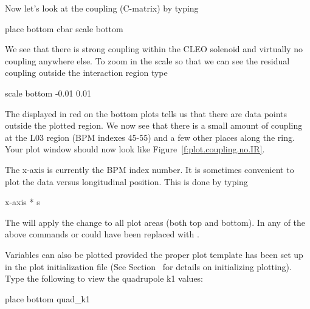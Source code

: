 Now let's look at the coupling (C-matrix) by typing
\begin{example}
  place bottom cbar
  scale bottom
\end{example}
We see that there is strong coupling within the CLEO solenoid and
virtually no coupling anywhere else. To zoom in the scale so that we
can see the residual coupling outside the interaction region type
\begin{example}
  scale bottom -0.01 0.01
\end{example}
The  displayed in red on the bottom plots tells us
that there are data points outside the plotted region.  We now see
that there is a small amount of coupling at the L03 region (BPM
indexes 45-55) and a few other places along the ring. Your plot window
should now look like Figure~\ref{f:plot.coupling.no.IR}.

The x-axis is currently the BPM index number. It is sometimes
convenient to plot the data versus longitudinal position. This is done
by typing
\begin{example}
  x-axis * s
\end{example}

The  will apply the change to all plot areas (both top and
bottom). In any of the above commands  or  could
have been replaced with .

Variables can also be plotted provided the proper plot template has
been set up in the plot initialization file (See
Section~ for details on initializing plotting). Type
the following to view the quadrupole k1 values:
\begin{example}
  place bottom quad_k1
\end{example}


